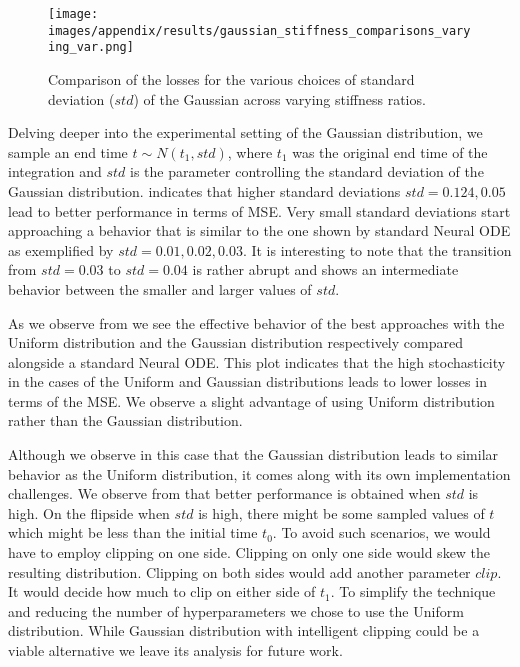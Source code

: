 \begin{wrapfigure}[14]{r}{0.4\textwidth}
	\centering
	\texttt{[image: images/appendix/results/gaussian\_stiffness\_comparisons\_varying\_var.png]}
	\caption{Comparison of the losses for the various choices of standard deviation ($std$) of the Gaussian across varying stiffness ratios.} 
	\label{fig:gaussian_stiffness_comparisons_var_varying}
\end{wrapfigure}


Delving deeper into the experimental setting of the Gaussian distribution, we sample an end time $t \sim N(t_1,std)$, where $t_1$ was the original end time of the integration and $std$ is the parameter controlling the standard deviation of the Gaussian distribution.  indicates that higher standard deviations $std=0.124,0.05$ lead to better performance in terms of MSE. Very small standard deviations start approaching a behavior that is similar to the one shown by standard Neural ODE as exemplified by $std=0.01,0.02,0.03$. It is interesting to note that the transition from $std=0.03$ to $std=0.04$ is rather abrupt and shows an intermediate behavior between the smaller and larger values of $std$.




As we observe from  we see the effective behavior of the best approaches with the Uniform distribution and the Gaussian distribution respectively compared alongside a standard Neural ODE. This plot indicates that the high stochasticity in the cases of the Uniform and Gaussian distributions leads to lower losses in terms of the MSE. We observe a slight advantage of using Uniform distribution rather than the Gaussian distribution.



Although we observe in this case that the Gaussian distribution leads to similar behavior as the Uniform distribution, it comes along with its own implementation challenges. We observe from  that better performance is obtained when $std$ is high. On the flipside when $std$ is high, there might be some sampled values of $t$ which might be less than the initial time $t_0$. To avoid such scenarios, we would have to employ clipping on one side. Clipping on only one side would skew the resulting distribution. Clipping on both sides would add another parameter $clip$. It would decide how much to clip on either side of $t_1$. To simplify the technique and reducing the number of hyperparameters we chose to use the Uniform distribution. While Gaussian distribution with intelligent clipping could be a viable alternative we leave its analysis for future work. 



